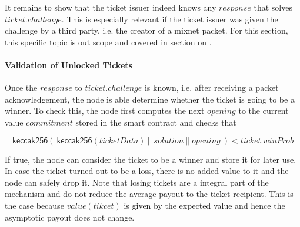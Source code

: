 It remains to show that the ticket issuer indeed knows any $response$ that solves $ticket.challenge$. This is especially relevant if the ticket issuer was given the challenge by a third party, i.e. the creator of a mixnet packet. For this section, this specific topic is out scope and covered in section on .

\paragraph{Validation of Unlocked Tickets}
\label{sec:tickets:validation:unlocked}

Once the $response$ to $ticket.challenge$ is known, i.e. after receiving a packet acknowledgement, the node is able determine whether the ticket is going to be a winner. To check this, the node first computes the next $opening$ to the current value $commitment$ stored in the smart contract and checks that

$$ \mathsf{keccak256} ( \ \mathsf{keccak256}(ticketData) \ || \ solution \ || \ opening \ ) < ticket.winProb $$

If true, the node can consider the ticket to be a winner and store it for later use. In case the ticket turned out to be a loss, there is no added value to it and the node can safely drop it. Note that losing tickets are a integral part of the mechanism and do not reduce the average payout to the ticket recipient. This is the case because $value(tikcet)$ is given by the expected value and hence the asymptotic payout does not change.